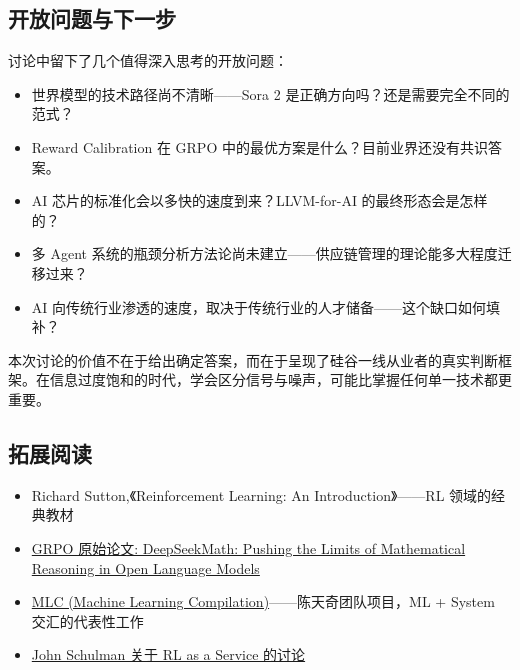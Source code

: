 \documentclass[a4paper]{article}
\begin{document}
\subsection{开放问题与下一步}

讨论中留下了几个值得深入思考的开放问题：

\begin{itemize}
    \item 世界模型的技术路径尚不清晰——Sora 2 是正确方向吗？还是需要完全不同的范式？
    \item Reward Calibration 在 GRPO 中的最优方案是什么？目前业界还没有共识答案。
    \item AI 芯片的标准化会以多快的速度到来？LLVM-for-AI 的最终形态会是怎样的？
    \item 多 Agent 系统的瓶颈分析方法论尚未建立——供应链管理的理论能多大程度迁移过来？
    \item AI 向传统行业渗透的速度，取决于传统行业的人才储备——这个缺口如何填补？
\end{itemize}

\vspace{1em}
\noindent 本次讨论的价值不在于给出确定答案，而在于呈现了硅谷一线从业者的真实判断框架。在信息过度饱和的时代，学会区分信号与噪声，可能比掌握任何单一技术都更重要。

\subsection{拓展阅读}

\begin{itemize}
    \item Richard Sutton,《Reinforcement Learning: An Introduction》——RL 领域的经典教材
    \item \href{https://arxiv.org/abs/2402.03300}{GRPO 原始论文: DeepSeekMath: Pushing the Limits of Mathematical Reasoning in Open Language Models}
    \item \href{https://mlc.ai/}{MLC (Machine Learning Compilation)}——陈天奇团队项目，ML + System 交汇的代表性工作
    \item \href{https://www.youtube.com/watch?v=2TvQebfBsNk}{John Schulman 关于 RL as a Service 的讨论}
\end{itemize}
\end{document}
